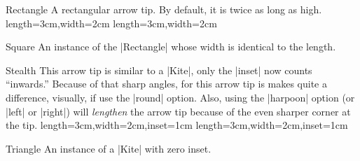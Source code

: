 \begin{arrowtip}{Rectangle}
  {
    A rectangular arrow tip. By default, it is twice as long as high. 
  }
  {length=3cm,width=2cm}
  {length=3cm,width=2cm}
  
  \begin{arrowexamples}
    \arrowexample[]
    \arrowexampledup[sep]
    \arrowexampledupdot[sep]
    \arrowexample[open]
    \arrowexample[length=4pt]
    \arrowexample[round]
    \arrowexample[slant=.3]
    \arrowexample[left]
    \arrowexample[right]
    \arrowexample[red]
  \end{arrowexamples}
\end{arrowtip}


\begin{arrowtipsimple}{Square}
  An instance of the |Rectangle| whose width is identical to the length.
  
  \begin{arrowexamples}
    \arrowexample[]
    \arrowexampledup[sep]
    \arrowexampledupdot[sep]
    \arrowexample[open]
    \arrowexample[length=4pt]
    \arrowexample[round]
    \arrowexample[slant=.3]
    \arrowexample[left]
    \arrowexample[right]
    \arrowexample[red]
  \end{arrowexamples}
\end{arrowtipsimple}



\begin{arrowtip}{Stealth}
  {
    This arrow tip is similar to a |Kite|, only the |inset| now counts
    ``inwards.'' Because of that sharp angles, for this arrow tip is
    makes quite a difference, visually, if use the |round|
    option. Also, using the |harpoon| option (or |left| or |right|)
    will \emph{lengthen} the arrow tip because of the even sharper
    corner at the tip.
  }
  {length=3cm,width=2cm,inset=1cm}
  {length=3cm,width=2cm,inset=1cm}
  
  \begin{arrowexamples}
    \arrowexample[]
    \arrowexampledup[sep]
    \arrowexampledupdot[sep]
    \arrowexample[open]
    \arrowexample[length=6pt,width=4pt]
    \arrowexample[length=6pt,width=4pt,inset=1.5pt]
    \arrowexample[round]
    \arrowexample[slant=.3]
    \arrowexample[left]
    \arrowexample[right]
    \arrowexample[red]
  \end{arrowexamples}
\end{arrowtip}


\begin{arrowtipsimple}{Triangle}
  An instance of a |Kite| with zero inset.
  
  \begin{arrowexamples}
    \arrowexample[]
    \arrowexampledup[sep]
    \arrowexampledupdot[sep]
    \arrowexample[open]
    \arrowexample[length=4pt]
    \arrowexample[round]
    \arrowexample[slant=.3]
    \arrowexample[left]
    \arrowexample[right]
    \arrowexample[red]
  \end{arrowexamples}
\end{arrowtipsimple}

